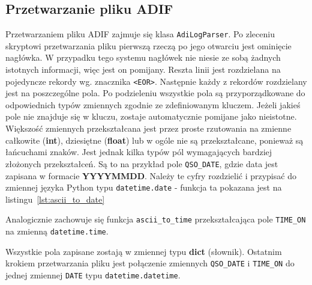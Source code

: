 \documentclass[]{mgr}
\begin{document}
            \subsection{Przetwarzanie pliku ADIF}
            Przetwarzaniem pliku ADIF zajmuje się klasa \texttt{AdiLogParser}. Po zleceniu skryptowi przetwarzania pliku pierwszą rzeczą po jego otwarciu jest ominięcie nagłówka. W przypadku tego systemu nagłówek nie niesie ze sobą żadnych istotnych informacji, więc jest on pomijany. Reszta linii jest rozdzielana na pojedyncze rekordy wg. znacznika \texttt{<EOR>}. Następnie każdy z rekordów rozdzielany jest na poszczególne pola. Po podzieleniu wszystkie pola są przyporządkowane do odpowiednich typów zmiennych zgodnie ze zdefiniowanym kluczem. Jeżeli jakieś pole nie znajduje się w kluczu, zostaje automatycznie pomijane jako nieistotne. Większość zmiennych przekształcana jest przez proste rzutowania na zmienne całkowite (\textbf{int}), dziesiętne (\textbf{float}) lub w ogóle nie są przekształcane, ponieważ są łańcuchami znaków. Jest jednak kilka typów pól wymagających bardziej złożonych przekształceń. Są to na przykład pole \texttt{QSO\_DATE}, gdzie data jest zapisana w formacie \textbf{YYYYMMDD}. Należy te cyfry rozdzielić i przypisać do zmiennej języka Python typu \texttt{datetime.date} - funkcja ta pokazana jest na listingu~\ref{lst:ascii_to_date}
            
            Analogicznie zachowuje się funkcja \texttt{ascii\_to\_time} przekształcająca pole \texttt{TIME\_ON} na zmienną \texttt{datetime.time}.

            Wszystkie pola zapisane zostają w zmiennej typu \textbf{dict} (słownik). Ostatnim krokiem przetwarzania pliku jest połączenie zmiennych \texttt{QSO\_DATE} i \texttt{TIME\_ON} do jednej zmiennej \texttt{DATE} typu \texttt{datetime.datetime}.
\end{document}
